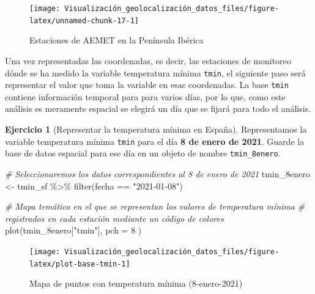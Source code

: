 \documentclass[
]{book}
\newenvironment{Shaded}{\begin{snugshade}}{\end{snugshade}}
\newcommand{\AttributeTok}[1]{\textcolor[rgb]{0.77,0.63,0.00}{#1}}
\newcommand{\CommentTok}[1]{\textcolor[rgb]{0.56,0.35,0.01}{\textit{#1}}}
\newcommand{\DecValTok}[1]{\textcolor[rgb]{0.00,0.00,0.81}{#1}}
\newcommand{\FunctionTok}[1]{\textcolor[rgb]{0.00,0.00,0.00}{#1}}
\newcommand{\NormalTok}[1]{#1}
\newcommand{\OtherTok}[1]{\textcolor[rgb]{0.56,0.35,0.01}{#1}}
\newcommand{\SpecialCharTok}[1]{\textcolor[rgb]{0.00,0.00,0.00}{#1}}
\newcommand{\StringTok}[1]{\textcolor[rgb]{0.31,0.60,0.02}{#1}}
\theoremstyle{definition}
\theoremstyle{definition}
\theoremstyle{definition}
\newtheorem{exercise}{Ejercicio}[chapter]
\theoremstyle{definition}
\theoremstyle{remark}
\begin{document}
\begin{figure}

{\centering \texttt{[image: Visualización\_geolocalización\_datos\_files/figure-latex/unnamed-chunk-17-1]} 

}

\caption{Estaciones de AEMET en la Península Ibérica}\label{fig:unnamed-chunk-17}
\end{figure}

Una vez representadas las coordenadas, es decir, las estaciones de monitoreo
dónde se ha medido la variable temperatura mínima \texttt{tmin}, el siguiente paso será
representar el valor que toma la variable en esas coordenadas. La base \texttt{tmin}
contiene información temporal para para varios días, por lo que, como este
análisis es meramente espacial se elegirá un día que se fijará para todo el
análisis.

\begin{exercise}[Representar la temperatura mínima en España]
\protect\hypertarget{exr:ex10}{}\label{exr:ex10}Representamos la variable temperatura mínima \texttt{tmin} para el día \textbf{8 de enero de
2021}. Guarde la base de datos espacial para ese día en un objeto de nombre
\texttt{tmin\_8enero}.
\end{exercise}

\begin{Shaded}
\begin{Highlighting}[]

\CommentTok{\# Seleccionaremos los datos correspondientes al 8 de enero de 2021}
\NormalTok{tmin\_8enero }\OtherTok{\textless{}{-}}\NormalTok{ tmin\_sf }\SpecialCharTok{\%\textgreater{}\%}
  \FunctionTok{filter}\NormalTok{(fecha }\SpecialCharTok{==} \StringTok{"2021{-}01{-}08"}\NormalTok{)}


\CommentTok{\# Mapa temático en el que se representan los valores de temperatura mínima}
\CommentTok{\# registrados en cada estación mediante un código de colores}
\FunctionTok{plot}\NormalTok{(tmin\_8enero[}\StringTok{"tmin"}\NormalTok{],}
  \AttributeTok{pch =} \DecValTok{8}
\NormalTok{)}
\end{Highlighting}
\end{Shaded}

\begin{figure}

{\centering \texttt{[image: Visualización\_geolocalización\_datos\_files/figure-latex/plot-base-tmin-1]} 

}

\caption{Mapa de puntos con temperatura mínima (8-enero-2021)}\label{fig:plot-base-tmin}
\end{figure}
\end{document}
